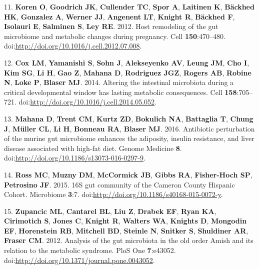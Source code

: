 \documentclass[12pt,]{article}
\begin{document}
11. \textbf{Koren O}, \textbf{Goodrich JK}, \textbf{Cullender TC},
\textbf{Spor A}, \textbf{Laitinen K}, \textbf{Bäckhed HK},
\textbf{Gonzalez A}, \textbf{Werner JJ}, \textbf{Angenent LT},
\textbf{Knight R}, \textbf{Bäckhed F}, \textbf{Isolauri E},
\textbf{Salminen S}, \textbf{Ley RE}. 2012. Host remodeling of the gut
microbiome and metabolic changes during pregnancy. Cell
\textbf{150}:470--480.
doi:\url{http://doi.org/10.1016/j.cell.2012.07.008}.

12. \textbf{Cox LM}, \textbf{Yamanishi S}, \textbf{Sohn J},
\textbf{Alekseyenko AV}, \textbf{Leung JM}, \textbf{Cho I}, \textbf{Kim
SG}, \textbf{Li H}, \textbf{Gao Z}, \textbf{Mahana D}, \textbf{Rodriguez
JGZ}, \textbf{Rogers AB}, \textbf{Robine N}, \textbf{Loke P},
\textbf{Blaser MJ}. 2014. Altering the intestinal microbiota during a
critical developmental window has lasting metabolic consequences. Cell
\textbf{158}:705--721.
doi:\url{http://doi.org/10.1016/j.cell.2014.05.052}.

13. \textbf{Mahana D}, \textbf{Trent CM}, \textbf{Kurtz ZD},
\textbf{Bokulich NA}, \textbf{Battaglia T}, \textbf{Chung J},
\textbf{Müller CL}, \textbf{Li H}, \textbf{Bonneau RA}, \textbf{Blaser
MJ}. 2016. Antibiotic perturbation of the murine gut microbiome enhances
the adiposity, insulin resistance, and liver disease associated with
high-fat diet. Genome Medicine \textbf{8}.
doi:\url{http://doi.org/10.1186/s13073-016-0297-9}.

14. \textbf{Ross MC}, \textbf{Muzny DM}, \textbf{McCormick JB},
\textbf{Gibbs RA}, \textbf{Fisher-Hoch SP}, \textbf{Petrosino JF}. 2015.
16S gut community of the Cameron County Hispanic Cohort. Microbiome
\textbf{3}:7. doi:\url{http://doi.org/10.1186/s40168-015-0072-y}.

15. \textbf{Zupancic ML}, \textbf{Cantarel BL}, \textbf{Liu Z},
\textbf{Drabek EF}, \textbf{Ryan KA}, \textbf{Cirimotich S},
\textbf{Jones C}, \textbf{Knight R}, \textbf{Walters WA},
\textbf{Knights D}, \textbf{Mongodin EF}, \textbf{Horenstein RB},
\textbf{Mitchell BD}, \textbf{Steinle N}, \textbf{Snitker S},
\textbf{Shuldiner AR}, \textbf{Fraser CM}. 2012. Analysis of the gut
microbiota in the old order Amish and its relation to the metabolic
syndrome. PloS One \textbf{7}:e43052.
doi:\url{http://doi.org/10.1371/journal.pone.0043052}.
\end{document}

